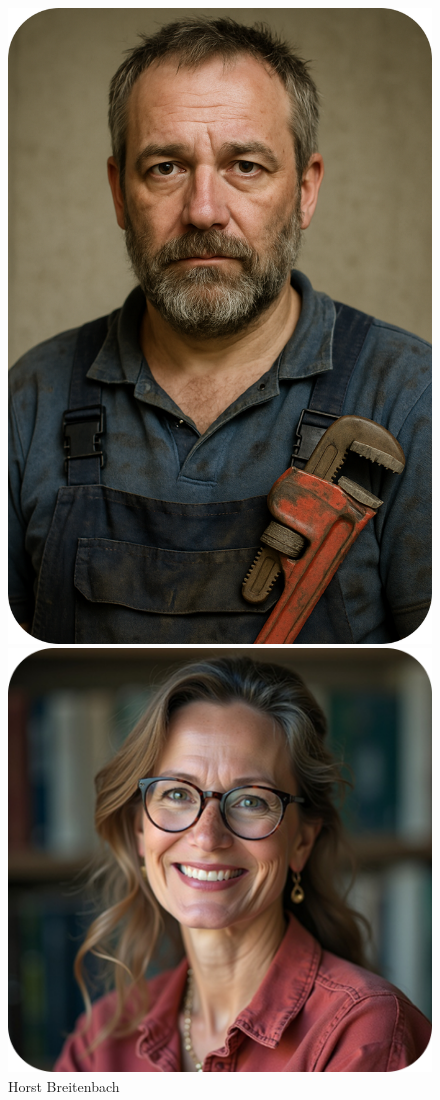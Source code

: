 \begin{figure}[h!]
\begin{minipage}{0.12\linewidth}
		\includegraphics[width=\linewidth]{images/Horst}
		\caption*{Horst Breitenbach}
	\end{minipage}
	\hfill
	\begin{minipage}{0.12\linewidth}
		\centering
		\includegraphics[width=\linewidth]{images/Heike}

\end{minipage}
\end{figure}
